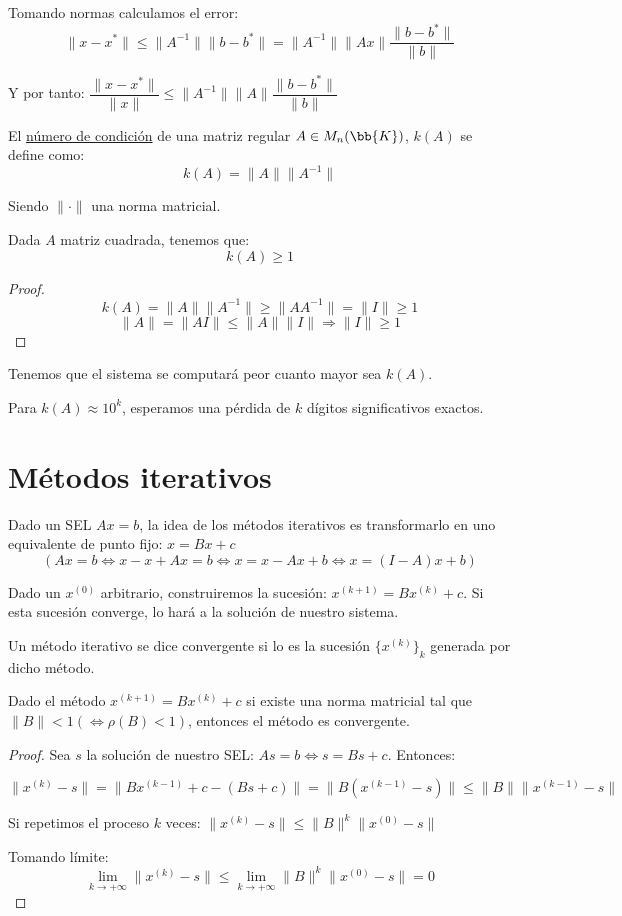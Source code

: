 Tomando normas calculamos el error:
$$\|x-x^{*}\| \leq \|A^{-1}\|\|b-b^{*}\| = \|A^{-1}\|\|Ax\| \dfrac{\|b-b^{*}\|}{\|b\|}$$

Y por tanto: $\dfrac{\|x-x^{*}\|}{\|x\|}\leq \|A^{-1}\|\|A\| \dfrac{\|b-b^{*}\|}{\|b\|}$

\begin{definicion}
    El \underline{número de condición} de una matriz regular $A \in M_n(\bb{K})$, $k(A)$ se define como:
    $$k(A)=\|A\|\|A^{-1}\|$$

    Siendo $\|\cdot\|$ una norma matricial.
\end{definicion}

\begin{lema}
    Dada $A$ matriz cuadrada, tenemos que:
    $$k(A)\geq 1$$
\end{lema}
\begin{proof}
$$k(A)=\|A\|\|A^{-1}\| \geq \|AA^{-1}\| = \|I\| \geq 1$$
$$\|A\| = \|AI\| \leq \|A\|\|I\| \Rightarrow \|I\| \geq 1$$   
\end{proof}


Tenemos que el sistema se computará peor cuanto mayor sea $k(A)$.

Para $k(A)\approx 10^k$, esperamos una pérdida de $k$ dígitos significativos exactos.

\section{Métodos iterativos}
\noindent
Dado un SEL $Ax=b$, la idea de los métodos iterativos es transformarlo en uno equivalente de punto fijo: $x=Bx+c$
$$(Ax=b \Leftrightarrow x-x+Ax=b \Leftrightarrow x=x-Ax+b \Leftrightarrow x=(I-A)x+b)$$

\noindent
Dado un $x^{(0)}$ arbitrario, construiremos la sucesión: $x^{(k+1)}=Bx^{(k)}+c$. Si esta sucesión converge, lo hará
a la solución de nuestro sistema.


\begin{definicion}
    Un método iterativo se dice convergente si lo es la sucesión $\{x^{(k)}\}_k$ generada por dicho método.
\end{definicion}

\begin{teo}
    Dado el método $x^{(k+1)}=Bx^{(k)}+c$ si existe una norma matricial tal que $\|B\|<1 (\Leftrightarrow \rho(B)<1)$, entonces el método es convergente.
\end{teo}
\begin{proof}
    Sea $s$ la solución de nuestro SEL: $As=b \Leftrightarrow s=Bs+c$. Entonces:

    $\|x^{(k)}-s\| = \|Bx^{(k-1)}+c-(Bs+c)\| = \|B(x^{(k-1)}-s)\| \leq \|B\|\|x^{(k-1)}-s\|$

    Si repetimos el proceso $k$ veces: $\|x^{(k)}-s\|\leq \|B\|^k \|x^{(0)}-s\|$

    Tomando límite:
    $$\lim_{k \to +\infty}\|x^{(k)}-s\| \leq \lim_{k \to +\infty}\|B\|^k\|x^{(0)}-s\|=0$$
\end{proof}

